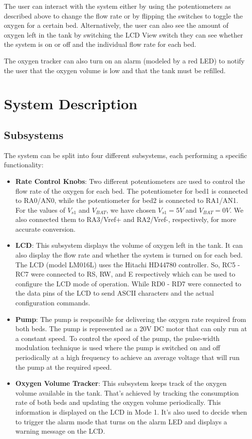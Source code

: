 \documentclass[a4paper, 12pt]{article}
\begin{document}
\par The user can interact with the system either by using the potentiometers as described above to change the flow rate or by flipping the switches to toggle the oxygen for a certain bed. Alternatively, the user can also see the amount of oxygen left in the tank by switching the LCD View switch they can see whether the system is on or off and the individual flow rate for each bed. \\

\par The oxygen tracker can also turn on an alarm (modeled by a red LED) to notify the user that the oxygen volume is low and that the tank must be refilled.

\section{System Description}
\subsection{Subsystems}
\par The system can be split into four different subsystems, each performing a specific functionality:
\begin{itemize}
  \item \textbf{Rate Control Knobs}: Two different potentiometers are used to control the flow rate of the oxygen for each bed. The potentiometer for bed1 is connected to RA0/AN0, while the potentiometer for bed2 is connected to RA1/AN1. For the values of $V_{s1}$ and $V_{BAT}$, we have chosen $V_{s1} = 5V$ and $V_{BAT} = 0V$. We also connected them to RA3/Vref+ and RA2/Vref-, respectively, for more accurate conversion.

  \item \textbf{LCD}: This subsystem displays the volume of oxygen left in the tank. It can also display the flow rate and whether the system is turned on for each bed. The LCD (model LM016L) uses the Hitachi HD44780 controller. So, RC5 - RC7 were connected to RS, RW, and E respectively which can be used to configure the LCD mode of operation. While RD0 - RD7 were connected to the data pins of the LCD to send ASCII characters and the actual configuration commands.

  \item \textbf{Pump}: The pump is responsible for delivering the oxygen rate required from both beds. The pump is represented as a 20V DC motor that can only run at a constant speed. To control the speed of the pump, the pulse-width modulation technique is used where the pump is switched on and off periodically at a high frequency to achieve an average voltage that will run the pump at the required speed.

  \item \textbf{Oxygen Volume Tracker}: This subsystem keeps track of the oxygen volume available in the tank. That’s achieved by tracking the consumption rate of both beds and updating the oxygen volume periodically. This information is displayed on the LCD in Mode 1. It’s also used to decide when to trigger the alarm mode that turns on the alarm LED and displays a warning message on the LCD.
\end{itemize}
\end{document}
